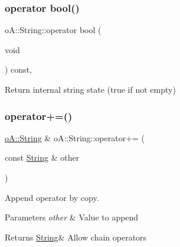 \subsubsection{\texorpdfstring{operator bool()}{operator bool()}}
{\footnotesize\ttfamily o\+A\+::\+String\+::operator bool (\begin{DoxyParamCaption}\item[{void}]{ }\end{DoxyParamCaption}) const\hspace{0.3cm}{\ttfamily [inline]}, {\ttfamily [noexcept]}}



Return internal string state (true if not empty) 

\mbox{\label{classo_a_1_1_string_a748a9d3de7d14593f24d5e82fc306413}} 
\subsubsection{\texorpdfstring{operator+=()}{operator+=()}\hspace{0.1cm}{\footnotesize\ttfamily [1/2]}}
{\footnotesize\ttfamily \mbox{\hyperlink{classo_a_1_1_string}{o\+A\+::\+String}} \& o\+A\+::\+String\+::operator+= (\begin{DoxyParamCaption}\item[{const \mbox{\hyperlink{classo_a_1_1_string}{String}} \&}]{other }\end{DoxyParamCaption})\hspace{0.3cm}{\ttfamily [noexcept]}}



Append operator by copy. 


\begin{DoxyParams}{Parameters}
{\em other} & Value to append \\
\hline
\end{DoxyParams}
\begin{DoxyReturn}{Returns}
\mbox{\hyperlink{classo_a_1_1_string}{String}}\& Allow chain operators 
\end{DoxyReturn}
\mbox{\label{classo_a_1_1_string_a99849336461c58e51681c68acd1fcafc}} 
